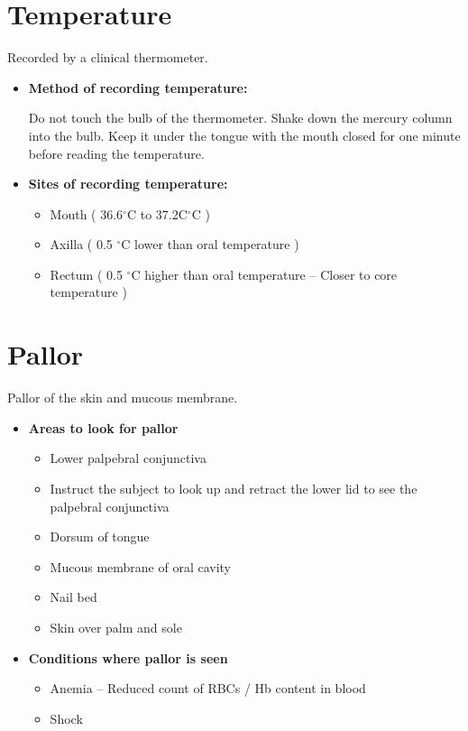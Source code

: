 \documentclass[a4paper,12pt,openany,oneside]{book}
\begin{document}
															\section*{Temperature}
															Recorded by a clinical thermometer.\newline
															\begin{itemize}
																	\itemsep0em
																\item{\textbf{Method of recording temperature:}}

																	Do not touch the bulb of the thermometer. Shake down the mercury column into the bulb. Keep it under the tongue with the mouth closed for one minute before reading the temperature.
																\item{\textbf{Sites of recording temperature:}}
																	\begin{itemize}%
																		\itemsep0em
																		\item{Mouth ( 36.6$^{\circ}$C to 37.2C$^{\circ}$C )}
																		\item{Axilla ( 0.5 $^{\circ}$C lower than oral temperature )}
																		\item{Rectum ( 0.5 $^{\circ}$C higher than oral temperature – Closer to core temperature )}
																	\end{itemize}
															\end{itemize}

															\section*{Pallor}
															Pallor of the skin and mucous membrane.
															\begin{itemize}
																\item{\textbf{Areas to look for pallor}}
																	\begin{itemize}
																			\itemsep0em
																		\item{Lower palpebral conjunctiva}
																		\item{Instruct the subject to look up and retract the lower lid to see the palpebral conjunctiva}
																		\item{Dorsum of tongue}
																		\item{Mucous membrane of oral cavity}
																		\item{Nail bed}
																		\item{Skin over palm and sole}
																	\end{itemize}

																\item{\textbf{Conditions where pallor is seen}}
																	\begin{itemize}
																			\itemsep0em
																		\item{Anemia – Reduced count of RBCs / Hb content in blood}
																		\item{Shock}
																	\end{itemize}
															\end{itemize}
\end{document}
